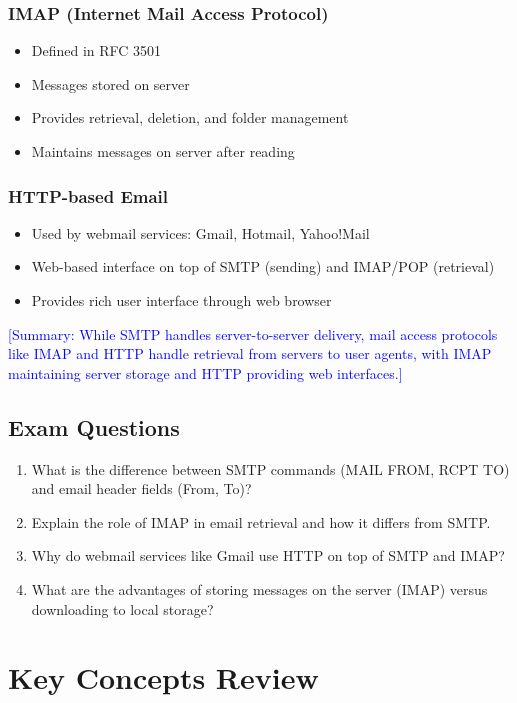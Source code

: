 \documentclass[12pt]{article}
\begin{document}
\subsubsection{IMAP (Internet Mail Access Protocol)}
\begin{itemize}
    \item Defined in RFC 3501
    \item Messages stored on server
    \item Provides retrieval, deletion, and folder management
    \item Maintains messages on server after reading
\end{itemize}

\subsubsection{HTTP-based Email}
\begin{itemize}
    \item Used by webmail services: Gmail, Hotmail, Yahoo!Mail
    \item Web-based interface on top of SMTP (sending) and IMAP/POP (retrieval)
    \item Provides rich user interface through web browser
\end{itemize}

\textcolor{blue}{[Summary: While SMTP handles server-to-server delivery, mail access protocols like IMAP and HTTP handle retrieval from servers to user agents, with IMAP maintaining server storage and HTTP providing web interfaces.]}

\subsection{Exam Questions}
\begin{enumerate}
    \item What is the difference between SMTP commands (MAIL FROM, RCPT TO) and email header fields (From, To)?
    \item Explain the role of IMAP in email retrieval and how it differs from SMTP.
    \item Why do webmail services like Gmail use HTTP on top of SMTP and IMAP?
    \item What are the advantages of storing messages on the server (IMAP) versus downloading to local storage?
\end{enumerate}

\section{Key Concepts Review}
\end{document}
